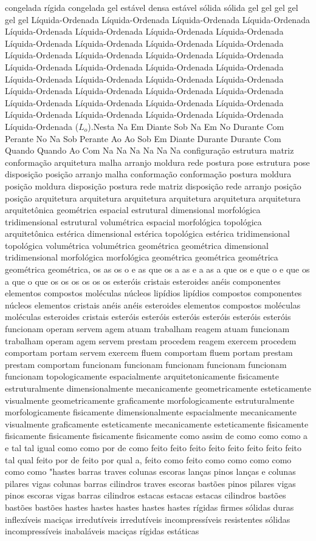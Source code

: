 congelada rígida congelada gel estável densa estável sólida sólida gel gel gel gel gel gel Líquida-Ordenada Líquida-Ordenada Líquida-Ordenada Líquida-Ordenada Líquida-Ordenada Líquida-Ordenada Líquida-Ordenada Líquida-Ordenada Líquida-Ordenada Líquida-Ordenada Líquida-Ordenada Líquida-Ordenada Líquida-Ordenada Líquida-Ordenada Líquida-Ordenada Líquida-Ordenada Líquida-Ordenada Líquida-Ordenada Líquida-Ordenada Líquida-Ordenada Líquida-Ordenada Líquida-Ordenada Líquida-Ordenada Líquida-Ordenada Líquida-Ordenada Líquida-Ordenada Líquida-Ordenada Líquida-Ordenada Líquida-Ordenada Líquida-Ordenada Líquida-Ordenada Líquida-Ordenada Líquida-Ordenada Líquida-Ordenada Líquida-Ordenada Líquida-Ordenada Líquida-Ordenada ($L_o$).Nesta Na Em Diante Sob Na Em No Durante Com Perante No Na Sob Perante Ao Ao Sob Em Diante Durante Durante Com Quando Quando Ao Com Na Na Na Na Na Na configuração estrutura matriz conformação arquitetura malha arranjo moldura rede postura pose estrutura pose disposição posição arranjo malha conformação conformação postura moldura posição moldura disposição postura rede matriz disposição rede arranjo posição posição arquitetura arquitetura arquitetura arquitetura arquitetura arquitetura arquitetônica geométrica espacial estrutural dimensional morfológica tridimensional estrutural volumétrica espacial morfológica topológica arquitetônica estérica dimensional estérica topológica estérica tridimensional topológica volumétrica volumétrica geométrica geométrica dimensional tridimensional morfológica morfológica geométrica geométrica geométrica geométrica geométrica, os as os o e as que os a as e a as a que os e que o e que os a que o que os os os os os os esteróis cristais esteroides anéis componentes elementos compostos moléculas núcleos lipídios lipídios compostos componentes núcleos elementos cristais anéis anéis esteroides elementos compostos moléculas moléculas esteroides cristais esteróis esteróis esteróis esteróis esteróis esteróis funcionam operam servem agem atuam trabalham reagem atuam funcionam trabalham operam agem servem prestam procedem reagem exercem procedem comportam portam servem exercem fluem comportam fluem portam prestam prestam comportam funcionam funcionam funcionam funcionam funcionam funcionam topologicamente espacialmente arquitetonicamente fisicamente estruturalmente dimensionalmente mecanicamente geometricamente esteticamente visualmente geometricamente graficamente morfologicamente estruturalmente morfologicamente fisicamente dimensionalmente espacialmente mecanicamente visualmente graficamente esteticamente mecanicamente esteticamente fisicamente fisicamente fisicamente fisicamente fisicamente como assim de como como como a e tal tal igual como como por de como feito feito feito feito feito feito feito feito tal qual feito por de feito por qual a, feito como feito como como como como como como "hastes barras traves colunas escoras lanças pinos lanças e colunas pilares vigas colunas barras cilindros traves escoras bastões pinos pilares vigas pinos escoras vigas barras cilindros estacas estacas estacas cilindros bastões bastões bastões hastes hastes hastes hastes hastes rígidas firmes sólidas duras inflexíveis maciças irredutíveis irredutíveis incompressíveis resistentes sólidas incompressíveis inabaláveis maciças rígidas estáticas 